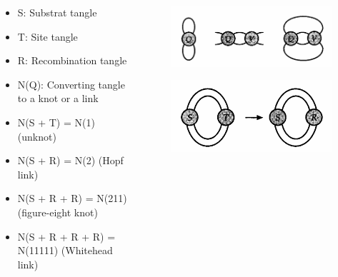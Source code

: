 \begin{frame}
	\begin{columns}[T]
		\begin{column}{.48\textwidth}
			\begin{itemize}
				\item S: Substrat tangle
				\item T: Site tangle
				\item R: Recombination tangle
				\item N(Q): Converting tangle to a knot or a link
				\item N(S + T) = N(1) (unknot)
				\item N(S + R) = N(2) (Hopf link)
				\item N(S + R + R) = N(211) (figure-eight knot)
				\item N(S + R + R + R) = N(11111) (Whitehead link)
			\end{itemize}
		\end{column}
		\begin{column}{.48\textwidth}
			\begin{figure}
				\centering
				\includegraphics[width=1\linewidth]{images/subtang.png}
				\label{subtang}
				\cite{adams2004knot}
			\end{figure}
			\begin{figure}
				\centering
				\includegraphics[width=0.75\linewidth]{images/substrat.png}
				\label{substrat}
				\cite{adams2004knot}
			\end{figure}
		\end{column}
	\end{columns}
\end{frame}
